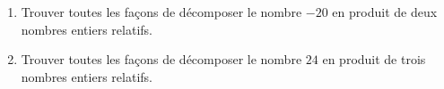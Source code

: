 
\begin{exercice}\label{exosmath-0750}

    \begin{enumerate}
        \item
Trouver toutes les façons de décomposer le nombre $-20$ en produit de deux nombres entiers relatifs.
\item
Trouver toutes les façons de décomposer le nombre $24$ en produit de trois nombres entiers relatifs.
    \end{enumerate}

\end{exercice}
